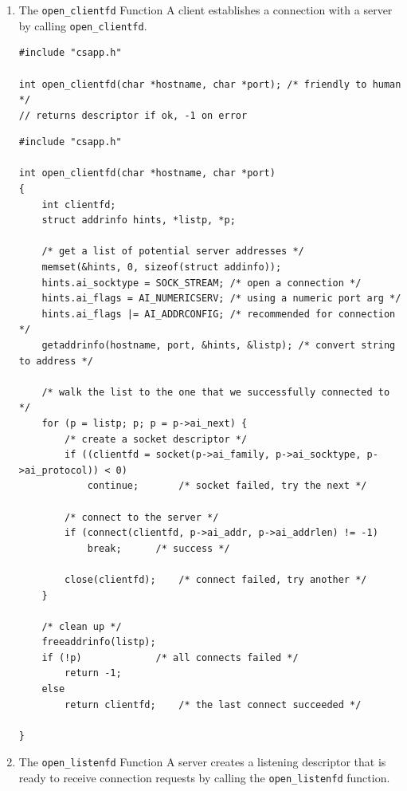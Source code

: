 \documentclass[11pt]{article}
\begin{document}
\begin{enumerate}
\item The \texttt{open\_clientfd} Function
\label{sec:org4a1b39a}
A client establishes a connection with a server by calling \texttt{open\_clientfd}.\\

\begin{verbatim}
#include "csapp.h"

int open_clientfd(char *hostname, char *port); /* friendly to human */
// returns descriptor if ok, -1 on error

\end{verbatim}

\begin{verbatim}
#include "csapp.h"

int open_clientfd(char *hostname, char *port)
{
    int clientfd;
    struct addrinfo hints, *listp, *p;

    /* get a list of potential server addresses */
    memset(&hints, 0, sizeof(struct addinfo));
    hints.ai_socktype = SOCK_STREAM; /* open a connection */
    hints.ai_flags = AI_NUMERICSERV; /* using a numeric port arg */
    hints.ai_flags |= AI_ADDRCONFIG; /* recommended for connection */
    getaddrinfo(hostname, port, &hints, &listp); /* convert string to address */

    /* walk the list to the one that we successfully connected to */
    for (p = listp; p; p = p->ai_next) {
        /* create a socket descriptor */
        if ((clientfd = socket(p->ai_family, p->ai_socktype, p->ai_protocol)) < 0)
            continue;		/* socket failed, try the next */

        /* connect to the server */
        if (connect(clientfd, p->ai_addr, p->ai_addrlen) != -1)
            break;		/* success */

        close(clientfd);	/* connect failed, try another */
    }

    /* clean up */
    freeaddrinfo(listp);
    if (!p) 			/* all connects failed */
        return -1;
    else
        return clientfd;	/* the last connect succeeded */

}

\end{verbatim}

\item The \texttt{open\_listenfd} Function
\label{sec:org5df03f8}
A server creates a listening descriptor that is ready to receive connection requests by calling the \texttt{open\_listenfd} function.\\


\end{enumerate}
\end{document}
